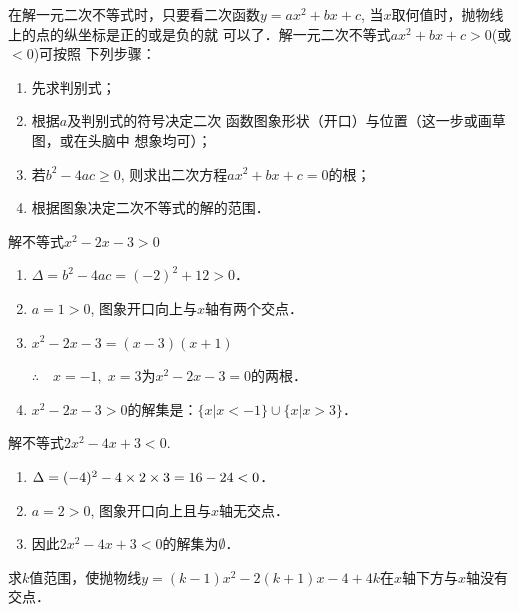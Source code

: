 在解一元二次不等式时，只要看二次函数$y=ax^2+bx+
c$, 当$x$取何值时，抛物线上的点的纵坐标是正的或是负的就
可以了．解一元二次不等式$ax^2+bx+c>0$(或$<0$)可按照
下列步骤：
\begin{enumerate}
    \item 先求判别式；
    \item 根据$a$及判别式的符号决定二次
函数图象形状（开口）与位置（这一步或画草图，或在头脑中
想象均可）；
\item 若$b^2-4ac\ge 0$, 则求出二次方程$ax^2+bx+
c=0$的根；
\item 根据图象决定二次不等式的解的范围．
\end{enumerate}




\begin{example}
    解不等式$x^2-2x-3>0$
\end{example}

\begin{solution}
\begin{enumerate}
    \item $\Delta=b^2-4ac=(-2)^2+12>0$．
    \item $a=1>0$, 图象开口向上与$x$轴有两个交点．
    \item $x^2-2x-3=(x-3)(x+1)$
    
    $\therefore\quad x=-1,\; x=3$为$x^2-2x-3=0$的两根．

    \item $x^2-2x-3>0$的解集是：$\{x|x<-1\}\cup \{x|x>3\}$．
\end{enumerate}
\end{solution}

\begin{example}
解不等式$2x^2-4x+3<0$.
\end{example}

\begin{solution}
\begin{enumerate}
    \item $\Delta=(-4)^2-4\times2\times3=16-24<0$．
    \item $a=2>0$, 图象开口向上且与$x$轴无交点．
    \item 因此$2x^2-4x+3<0$的解集为$\emptyset$．
\end{enumerate} 
\end{solution}

\begin{example}
    求$k$值范围，使抛物线$y=(k-1)x^2-2(k+1)x-4+4k$在$x$轴下方与$x$轴没有交点．
\end{example}

